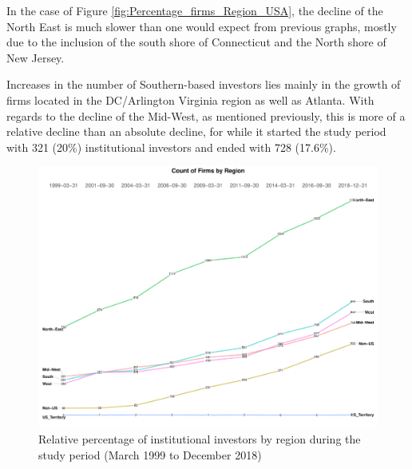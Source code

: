 \label{Atlanta}


In the case of Figure \ref{fig:Percentage_firms_Region_USA}, the decline of the North East is much slower than one would expect from previous graphs, mostly due to the inclusion of the south shore of Connecticut and the North shore of New Jersey.  


Increases in the number of Southern-based investors lies mainly in the growth of firms located in the DC/Arlington Virginia region as well as Atlanta. With regards to the decline of the Mid-West, as mentioned previously, this is more of a relative decline than an absolute decline, for while it started the study period with 321 (20\%) institutional investors and ended with 728 (17.6\%).


\begin{figure}
	\centering
	\includegraphics[width=1\linewidth]{Figures/ChapterIII/Count_firms_USA}
	\caption[Count of Institutional Investors by Region (as defined by the US Census Bureau) for the Period 1999 to 2018]{Relative percentage of institutional investors by region during the study period (March 1999 to December 2018)}
	\label{fig:countfirmsusa}
\end{figure}

